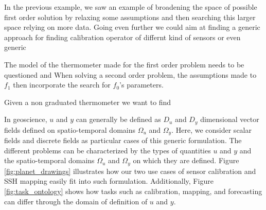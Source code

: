 \begin{bibunit}
{{{{In the previous example, we saw an example of broadening the space of possible first order solution by relaxing some assumptions and then searching this larger space relying on more data.
Going even further we could aim at finding a generic approach for finding calibration operator of differnt kind of sensors or even generic 




  The model of the thermometer made for the first order problem needs to be questioned and 
  When solving a second order problem, the assumptions made to 
  $f_1$ then incorporate the search for $f_0$'s parameters.



Given a non graduated thermometer we want to find 


In geoscience, $u$ and $y$ can generally be defined as $D_u$ and $D_y$ dimensional vector fields defined on spatio-temporal domains $\Omega_u$ and $\Omega_y$. Here, we consider scalar fields and discrete fields as particular cases of this generic formulation. The different problems can be characterized by the types of quantities $u$ and $y$ and the spatio-temporal domains $\Omega_u$ and $\Omega_y$ on which they are defined. Figure \ref{fig:planet_drawings} illustrates how our two use cases of sensor calibration and SSH mapping easily fit into such formulation. Additionally, Figure \ref{fig:task_ontology} shows how tasks such as calibration, mapping, and forecasting can differ through the domain of definition of $u$ and $y$.

}}}}
\end{bibunit}
